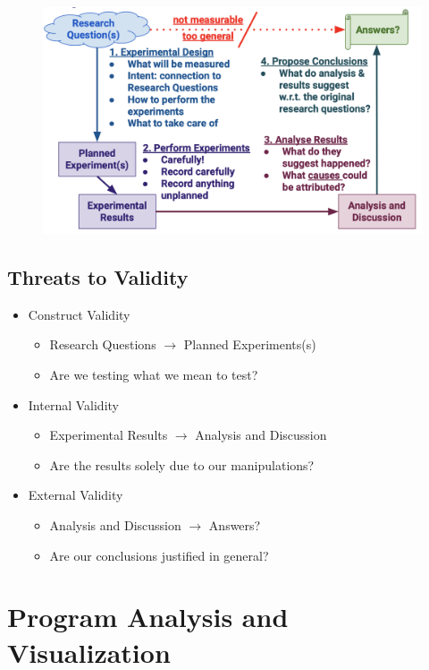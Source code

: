 \documentclass{article}
\begin{document}
\begin{figure}[H]
    \centering
    \includegraphics[width=\textwidth]{the_empirical_method}
\end{figure}

\subsection{Threats to Validity}

\begin{itemize}
    \item Construct Validity
    \begin{itemize}
        \item Research Questions $\rightarrow$ Planned Experiments(s)
        \item Are we testing what we mean to test?
    \end{itemize}
    \item Internal Validity
    \begin{itemize}
        \item Experimental Results $\rightarrow$ Analysis and Discussion
        \item Are the results solely due to our manipulations?
    \end{itemize}
    \item External Validity
    \begin{itemize}
        \item Analysis and Discussion $\rightarrow$ Answers?
        \item Are our conclusions justiﬁed in general?
    \end{itemize}
\end{itemize}

\section{Program Analysis and Visualization}
\end{document}
